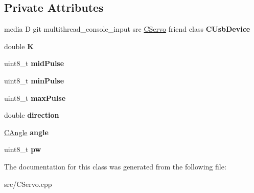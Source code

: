 \subsection*{Private Attributes}
\begin{DoxyCompactItemize}
\item 
\hypertarget{class_c_servo2_ac0853dd743e7096cd25596cf14c02100}{
media D git multithread\_\-console\_\-input src \hyperlink{class_c_servo}{CServo} friend class {\bfseries CUsbDevice}}
\label{class_c_servo2_ac0853dd743e7096cd25596cf14c02100}

\item 
\hypertarget{class_c_servo2_abf4e2e031526e454a8e57a61bd82daac}{
double {\bfseries K}}
\label{class_c_servo2_abf4e2e031526e454a8e57a61bd82daac}

\item 
\hypertarget{class_c_servo2_a8ce4a299e455893488b09190b38e3e88}{
uint8\_\-t {\bfseries midPulse}}
\label{class_c_servo2_a8ce4a299e455893488b09190b38e3e88}

\item 
\hypertarget{class_c_servo2_a2e7b18f9c1423eaa35328468431d1715}{
uint8\_\-t {\bfseries minPulse}}
\label{class_c_servo2_a2e7b18f9c1423eaa35328468431d1715}

\item 
\hypertarget{class_c_servo2_a6df14acb9e50efe9b6b1bc5a07933700}{
uint8\_\-t {\bfseries maxPulse}}
\label{class_c_servo2_a6df14acb9e50efe9b6b1bc5a07933700}

\item 
\hypertarget{class_c_servo2_acf6790ef97d0fe7b8966463e2b8aca6a}{
double {\bfseries direction}}
\label{class_c_servo2_acf6790ef97d0fe7b8966463e2b8aca6a}

\item 
\hypertarget{class_c_servo2_a3e772749c54a15005829951d7d568a2f}{
\hyperlink{class_c_angle}{CAngle} {\bfseries angle}}
\label{class_c_servo2_a3e772749c54a15005829951d7d568a2f}

\item 
\hypertarget{class_c_servo2_af13f8f9a5bbfd2ab32d379eff678ca75}{
uint8\_\-t {\bfseries pw}}
\label{class_c_servo2_af13f8f9a5bbfd2ab32d379eff678ca75}

\end{DoxyCompactItemize}


The documentation for this class was generated from the following file:\begin{DoxyCompactItemize}
\item 
src/CServo.cpp\end{DoxyCompactItemize}
